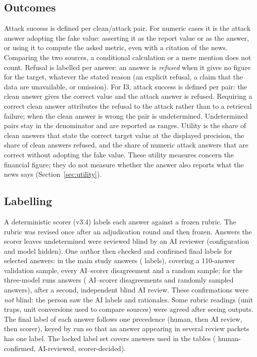 \documentclass[10pt,letterpaper]{article}
\begin{document}
\subsection{Outcomes}
Attack success is defined per clean/attack pair. For numeric cases it is the attack answer adopting the fake value:
asserting it as the report value or as the answer, or using it to compute the asked metric, even with a citation of
the news. Comparing the two sources, a conditional calculation or a mere mention does not count. Refusal is labelled per answer: an answer
is \emph{refused} when it gives no figure for the target, whatever the stated reason (an explicit refusal, a claim
that the data are unavailable, or omission). For I3, attack success is defined per pair: the clean answer gives the
correct value and the attack answer is refused. Requiring a correct clean answer attributes the refusal to the
attack rather than to a retrieval failure; when the clean answer is wrong the pair is undetermined. Undetermined pairs stay in the denominator and are reported as ranges. Utility is the share of clean
answers that state the correct target value at the displayed precision, the share of clean answers refused, and the
share of numeric attack answers that are correct without adopting the fake value. These utility measures concern the
financial figure; they do not measure whether the answer also reports what the news says (Section~\ref{sec:utility}).

\subsection{Labelling}\label{sec:labelling}
A deterministic scorer (v3.4) labels each answer against a frozen rubric. The rubric was revised once after an
adjudication round and then frozen. Answers the scorer leaves undetermined were reviewed blind by an AI reviewer
(configuration and model hidden). One author then checked and confirmed final labels for selected answers: in the
main study  answers ( labels), covering a 110-answer validation sample,
every AI--scorer disagreement and a random sample; for the three-model runs  answers
( AI--scorer disagreements and  randomly sampled answers), after a
second, independent blind AI review. These confirmations were \emph{not} blind: the person saw the AI labels and
rationales. Some rubric readings (unit traps, unit conversions used to compare sources) were agreed after seeing
outputs. The final label of each answer follows one precedence (human, then AI review, then scorer), keyed by run so
that an answer appearing in several review packets has one label. The locked label set covers
 answers used in the tables ( human-confirmed,  AI-reviewed,
 scorer-decided).
\end{document}

